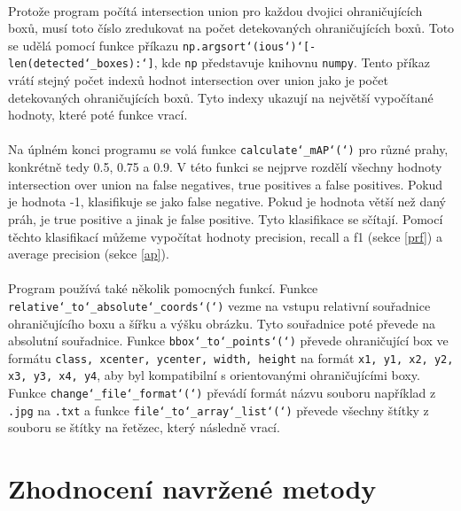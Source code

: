 \paragraph{} Protože program počítá intersection union pro každou dvojici ohraničujících boxů, musí toto číslo zredukovat na počet detekovaných ohraničujících boxů. Toto se udělá pomocí funkce příkazu \texttt{np.argsort\char`(ious\char`)\char`[-len(detected\char`_boxes):\char`]}, kde \texttt{np} představuje knihovnu \texttt{numpy}. Tento příkaz vrátí stejný počet indexů hodnot intersection over union jako je počet detekovaných ohraničujících boxů. Tyto indexy ukazují na největší vypočítané hodnoty, které poté funkce vrací.
\paragraph{} Na úplném konci programu se volá funkce \texttt{calculate\char`_mAP\char`(\char`)} pro různé prahy, konkrétně tedy 0.5, 0.75 a 0.9. V této funkci se nejprve rozdělí všechny hodnoty intersection over union na false negatives, true positives a false positives. Pokud je hodnota -1, klasifikuje se jako false negative. Pokud je hodnota větší než daný práh, je true positive a jinak je false positive. Tyto klasifikace se sčítají. Pomocí těchto klasifikací můžeme vypočítat hodnoty precision, recall a f1 (sekce \ref{prf}) a average precision (sekce \ref{ap}).
\paragraph{} Program používá také několik pomocných funkcí. Funkce \texttt{relative\char`_to\char`_absolute\char`_coords\char`(\char`)} vezme na vstupu relativní souřadnice ohraničujícího boxu a šířku a výšku obrázku. Tyto souřadnice poté převede na absolutní souřadnice. Funkce \texttt{bbox\char`_to\char`_points\char`(\char`)} převede ohraničující box ve formátu \texttt{class, xcenter, ycenter, width, height} na formát \texttt{x1, y1, x2, y2, x3, y3, x4, y4}, aby byl kompatibilní s orientovanými ohraničujícími boxy. \linebreak Funkce \texttt{change\char`_file\char`_format\char`(\char`)} převádí formát názvu souboru například z \texttt{.jpg} na \texttt{.txt} a funkce \texttt{file\char`_to\char`_array\char`_list\char`(\char`)} převede všechny štítky z souboru se štítky na řetězec, který následně vrací.



\section{Zhodnocení navržené metody}
\label{final_eval}
